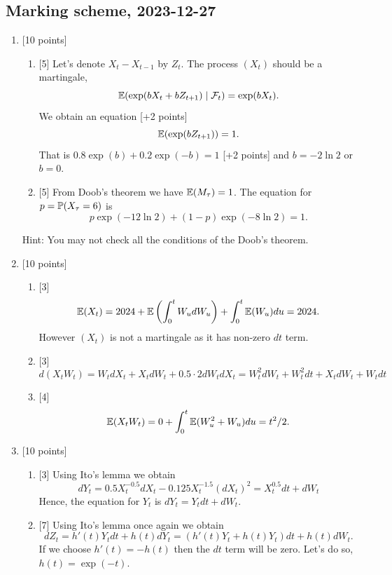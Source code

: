 \documentclass[12pt, a4paper]{article}
\newcommand{\cF}{\mathcal{F}}
\begin{document}
\subsection{Marking scheme, 2023-12-27}

\begin{enumerate}
\item {[10 points]} 
\begin{enumerate}
    \item {[5]} Let's denote $X_t- X_{t-1}$ by $Z_t$.
    The process $(X_t)$ should be a martingale,
    \[
    \E(\exp(bX_t + bZ_{t+1}) \mid \cF_t) = \exp(bX_t).
    \]
    We obtain an equation {[+2 points]}
    \[
    \E(\exp (bZ_{t+1})) = 1.  
    \]
    That is $0.8 \exp(b) + 0.2 \exp(-b) = 1$ {[+2 points]} and $b = -2\ln 2$ or $b=0$.
    \item {[5]} 
    From Doob's theorem we have $\E(M_{\tau}) = 1$. 
    The equation for $p = \P(X_{\tau} = 6)$ is
    \[
    p  \exp(-12\ln 2) + (1-p)\exp(-8\ln 2) = 1.
    \]
\end{enumerate}

Hint: You may not check all the conditions of the Doob's theorem.

\item {[10 points]} 
\begin{enumerate}
    \item {[3]} 
    \[
      \E(X_t) = 2024 + \E\left( \int_0^t W_u dW_u   \right) + \int_0^t \E(W_u) du  = 2024. 
    \]
    However $(X_t)$ is not a martingale as it has non-zero $dt$ term.
    \item {[3]} 
    \[
    d(X_t W_t) = W_t dX_t + X_t dW_t + 0.5 \cdot 2 dW_t dX_t = W_t^2 dW_t + W_t^2 dt + X_t dW_t + W_t dt  
    \]
    \item {[4]} 
    \[
      \E(X_t W_t) = 0 + \int_0^t \E(W_u^2 + W_u) du = t^2/2.  
    \]
\end{enumerate}

    
\item {[10 points]} 
\begin{enumerate}
    \item {[3]} Using Ito's lemma we obtain
    \[
      dY_t = 0.5 X_t^{-0.5} dX_t - 0.125 X_t^{-1.5} (dX_t)^2 = X_t^{0.5}dt + dW_t  
      \]
      Hence, the equation for $Y_t$ is $dY_t = Y_t dt + dW_t$.
      
    \item {[7]} Using Ito's lemma once again we obtain
    \[
    dZ_t = h'(t)Y_t dt + h(t) dY_t = (h'(t) Y_t + h(t) Y_t )dt + h(t) dW_t.
    \]
    If we choose $h'(t) = - h(t)$ then the $dt$ term will be zero. 
    Let's do so, $h(t) = \exp(-t)$. 


\end{enumerate}
\end{enumerate}
\end{document}
